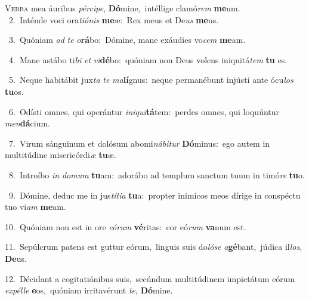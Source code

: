 \lettrine{\initial\textcolor{\initialcolor}{V}}{erba} mea áuribus \textit{pér}\-\textit{ci}\textit{pe}, \textbf{Dó}\-mine,~\star intéllige clamó\textit{rem} \textbf{me}\-um.\\
{\numbfont\textcolor{\numbcolor}{~2.}}~Inténde voci ora\-\textit{ti}\-\textit{ó}\textit{nis} \textbf{me}\-æ:~\star Rex meus et De\textit{us} \textbf{me}\-us.\par
{\numbfont\textcolor{\numbcolor}{~3.}}~Quóniam \textit{ad} \textit{te} \textit{o}\-\textbf{rá}bo:~\star Dómine, mane exáudies vo\textit{cem} \textbf{me}\-am.\par
{\numbfont\textcolor{\numbcolor}{~4.}}~Mane astábo ti\textit{bi} \textit{et} \textit{vi}\-\textbf{dé}bo:~\star quóniam non Deus volens iniquitá\textit{tem} \textbf{tu} es.\par
{\numbfont\textcolor{\numbcolor}{~5.}}~Neque habitábit jux\textit{ta} \textit{te} \textit{ma}\-\textbf{lí}gnus:~\star neque permanébunt injústi ante ócu\textit{los} \textbf{tu}\-os.\par
{\numbfont\textcolor{\numbcolor}{~6.}}~Odísti omnes, qui operántur \textit{in}\-\textit{i}\textit{qui}\textbf{tá}tem:~\star perdes omnes, qui loquúntur \textit{men}\-\textbf{dá}cium.\par
{\numbfont\textcolor{\numbcolor}{~7.}}~Virum sánguinum et dolósum abomi\-\textit{ná}\-\textit{bi}\textit{tur} \textbf{Dó}\-minus:~\star ego autem in multitúdine misericórdi\textit{æ} \textbf{tu}\-æ.\par
{\numbfont\textcolor{\numbcolor}{~8.}}~Introíbo \textit{in} \textit{do}\-\textit{mum} \textbf{tu}\-am:~\star adorábo ad templum sanctum tuum in timó\textit{re} \textbf{tu}\-o.\par
{\numbfont\textcolor{\numbcolor}{~9.}}~Dómine, deduc me in jus\-\textit{tí}\-\textit{ti}\textit{a} \textbf{tu}\-a:~\star propter inimícos meos dírige in conspéctu tuo vi\textit{am} \textbf{me}\-am.\par
{\numbfont\textcolor{\numbcolor}{10.}}~Quóniam non est in ore \textit{e}\-\textit{ó}\textit{rum} \textbf{vé}\-ritas:~\star cor eó\textit{rum} \textbf{va}\-num est.\par
{\numbfont\textcolor{\numbcolor}{11.}}~Sepúlcrum patens est guttur eórum,~\dagger linguis suis do\-\textit{ló}\-\textit{se} \textit{a}\-\textbf{gé}bant,~\star júdica il\-\textit{los}\-, \textbf{De}\-us.\par
{\numbfont\textcolor{\numbcolor}{12.}}~Décidant a cogitatiónibus suis,~\dagger secúndum multitúdinem impietátum eórum \textit{ex}\-\textit{pél}\textit{le} \textbf{e}\-os,~\star quóniam irritavérunt \textit{te}\-, \textbf{Dó}\-mine.\par
